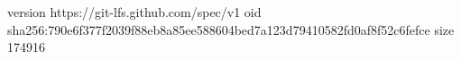 version https://git-lfs.github.com/spec/v1
oid sha256:790e6f377f2039f88eb8a85ee588604bed7a123d79410582fd0af8f52c6fefce
size 174916
